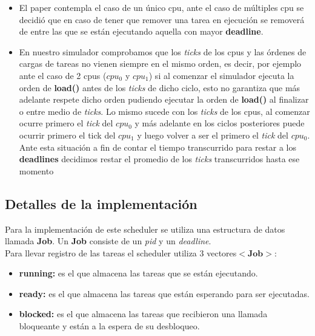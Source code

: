 \begin{itemize}
\item{El paper contempla el caso de un único cpu, ante el caso de múltiples cpu se decidió que en caso de tener que remover una tarea en ejecución se removerá de entre las que se están ejecutando aquella con mayor \textbf{deadline}.}
\item{En nuestro simulador comprobamos que los \textit{ticks} de los cpus y las órdenes de cargas de tareas no vienen siempre en el mismo orden, es decir, por ejemplo ante el caso de 2 cpus (\textit{$cpu_0$} y \textit{$cpu_1$}) si al comenzar el simulador ejecuta la orden de \textbf{load()} antes de los \textit{ticks} de dicho ciclo, esto no garantiza que más adelante respete dicho orden pudiendo ejecutar la orden de \textbf{load()} al finalizar o entre medio de \textit{ticks}. Lo mismo sucede con los \textit{ticks} de los cpus, al comenzar ocurre primero el \textit{tick} del \textit{$cpu_0$} y más adelante en los ciclos posteriores puede ocurrir primero el tick del \textit{$cpu_1$} y luego volver a ser el primero el \textit{tick} del \textit{$cpu_0$}. Ante esta situación a fin de contar el tiempo transcurrido para restar a los \textbf{deadlines} decidimos restar el promedio de los \textit{ticks} transcurridos hasta ese momento}
\end{itemize}

\subsection{Detalles de la implementación}

Para la implementación de este scheduler se utiliza una estructura de datos llamada \textbf{Job}. Un \textbf{Job} consiste de un \textit{pid} y un \textit{deadline}.\\
Para llevar registro de las tareas el scheduler utiliza 3 vectores$<\textbf{Job}>$:
\begin{itemize}
\item{\textbf{running:} es el que almacena las tareas que se están ejecutando.}
\item{\textbf{ready:} es el que almacena las tareas que están esperando para ser ejecutadas.}
\item{\textbf{blocked:} es el que almacena las tareas que recibieron una llamada bloqueante y están a la espera de su desbloqueo.}
\end{itemize}
 
